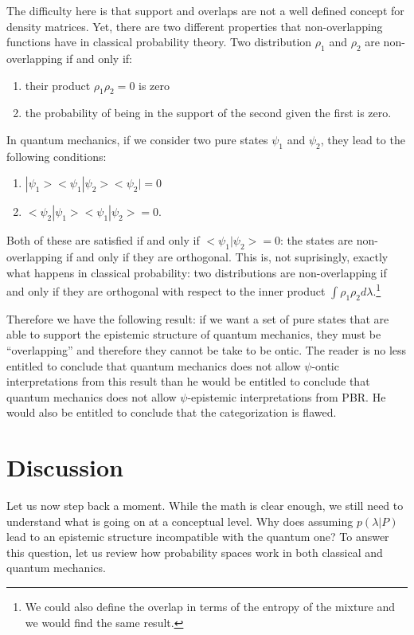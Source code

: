 \documentclass[10pt,twocolumn, nofootinbib]{revtex4-2}
\begin{document}
The difficulty here is that support and overlaps are not a well defined concept for density matrices. Yet, there are two different properties that non-overlapping functions have in classical probability theory. Two distribution $\rho_1$ and $\rho_2$ are non-overlapping if and only if:
\begin{enumerate}
	\item their product $\rho_1 \rho_2 = 0$ is zero
	\item the probability of being in the support of the second given the first is zero.
\end{enumerate}
In quantum mechanics, if we consider two pure states $\psi_1$ and $\psi_2$, they lead to the following conditions:
\begin{enumerate}
	\item $|\psi_1><\psi_1|\psi_2><\psi_2| = 0$
	\item $<\psi_2|\psi_1><\psi_1|\psi_2> = 0$.
\end{enumerate}
Both of these are satisfied if and only if $<\psi_1|\psi_2>=0$: the states are non-overlapping if and only if they are orthogonal. This is, not suprisingly, exactly what happens in classical probability: two distributions are non-overlapping if and only if they are orthogonal with respect to the inner product $\int \rho_1 \rho_2 d\lambda$.\footnote{We could also define the overlap in terms of the entropy of the mixture and we would find the same result.}

Therefore we have the following result: if we want a set of pure states that are able to support the epistemic structure of quantum mechanics, they must be ``overlapping'' and therefore they cannot be take to be ontic. The reader is no less entitled to conclude that quantum mechanics does not allow $\psi$-ontic interpretations from this result than he would be entitled to conclude that quantum mechanics does not allow $\psi$-epistemic interpretations from PBR. He would also be entitled to conclude that the categorization is flawed.



\section{Discussion}

Let us now step back a moment. While the math is clear enough, we still need to understand what is going on at a conceptual level. Why does assuming $p(\lambda|P)$ lead to an epistemic structure incompatible with the quantum one? To answer this question, let us review how probability spaces work in both classical and quantum mechanics.
\end{document}
